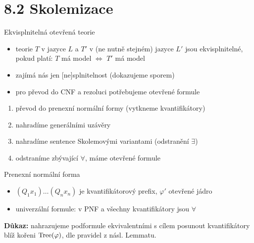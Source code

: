 \documentclass{beamer}
\begin{document}
\section{8.2 Skolemizace}


\begin{frame}{Ekvisplnitelná otevřená teorie}

    \begin{itemize}
        \item teorie $T$ v jazyce $L$ a $T'$ v (ne nutně stejném) jazyce $L'$ jsou  \alert{ekvisplnitelné}, pokud platí: $T$ má model $\Leftrightarrow$ $T'$ má model
        \item zajímá nás jen [ne]splnitelnost (dokazujeme sporem)
        \item pro převod do CNF a rezoluci potřebujeme otevřené formule 
    \end{itemize}


    \begin{enumerate}
        \item převod do \alert{prenexní normální formy} (vytkneme kvantifikátory)
        \item nahradíme generálními uzávěry 
        \item nahradíme sentence \alert{Skolemovými variantami} (odstranění $\exists$)
        \item odstraníme zbývající $\forall$, máme otevřené formule
    \end{enumerate}

\end{frame}


\begin{frame}{Prenexní normální forma}

    
    \begin{itemize}
        \item $(Q_1x_1)\dots(Q_nx_n)$ je \alert{kvantifikátorový prefix}, $\varphi'$ \alert{otevřené jádro}
        \item \alert{univerzální} formule: v PNF a všechny kvantifikátory jsou $\forall$
    \end{itemize}

    
    \textbf{Důkaz:} nahrazujeme podformule ekvivalentními s cílem posunout kvantifikátory blíž kořeni $\operatorname{Tree}(\varphi)$, dle pravidel z násl. Lemmatu.\hfill\qedsymbol



\end{frame}
\end{document}
